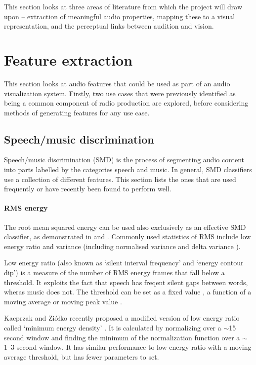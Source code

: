 This section looks at three areas of literature from which the project will
draw upon -- extraction of meaningful audio properties, mapping these to a
visual representation, and the perceptual links between audition and vision.

\section{Feature extraction}\label{sec:litreviewfeats}
This section looks at audio features that could be used as part of an audio
visualization system. Firstly, two use cases that were previously identified as
being a common component of radio production are explored, before considering
methods of generating features for any use case.

\subsection{Speech/music discrimination}
Speech/music discrimination (SMD) is the process of segmenting audio content
into parts labelled by the categories speech and music. In general, SMD
classifiers use a collection of different features. This section lists the ones
that are used frequently or have recently been found to perform well.

\paragraph{RMS energy}
The root mean squared energy can be used also exclusively as an effective SMD
classifier, as demonstrated in \citep{Ericsson2009} and \citep{Panagiotakis2005}.
Commonly used statistics of RMS include low energy ratio
\citep{Liang2005,Ericsson2009,Saunders1996,Scheirer1997} and variance
\citep{Ericsson2009} (including normalised variance \citep{Panagiotakis2005} and
delta variance \citep{Carey1999}).

Low energy ratio (also known as `silent interval frequency' and `energy contour
dip') is a measure of the number of RMS energy frames that fall below a
threshold. It exploits the fact that speech has freqent silent gaps between
words, wheras music does not. The threshold can be set as a fixed value
\citep{Liang2005}, a function of a moving average \citep{Ericsson2009} or moving
peak value \citep{Saunders1996}.

Kacprzak and Zi\'{o}\l{}ko recently proposed a modified version of low energy
ratio called `minimum energy density' \citep{Kacprzak2013}. It is calculated by
normalizing over a $\sim$15 second window and finding the minimum of the
normalization function over a $\sim$1--3 second window. It has similar
performance to low energy ratio with a moving average threshold, but has fewer
parameters to set.

